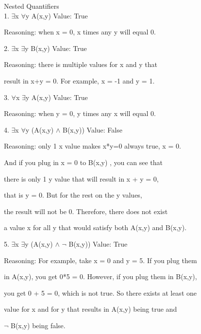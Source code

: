 \documentclass[10pt]{article}
\begin{document}
Nested Quantifiers
\\[\baselineskip] 

1. $\exists$x $\forall$y A(x,y)   
Value: True 

Reasoning: when x = 0, x times any y will equal 0.

2. $\exists$x $\exists$y B(x,y)   
Value: True 

Reasoning: there is multiple values for x and y that 

result in x+y = 0. For example, x = -1 and y = 1.

3. $\forall$x $\exists$y A(x,y)    
Value: True

Reasoning: when y = 0, y times any x will equal 0.

4. $\exists$x $\forall$y (A(x,y) $\land$ B(x,y))
Value: False

Reasoning: only 1 x value makes x*y=0 always true, x = 0.

And if you plug in x = 0 to B(x,y) , you can see that 

there is only 1 y value that will result in x + y = 0,

that is y = 0. But for the rest on the y values, 

the result will not be 0. Therefore, there does not exist 

a value x for all y that would satisfy both A(x,y) and B(x,y).

5. $\exists$x $\exists$y (A(x,y) $\land$ $\neg$ B(x,y))
Value: True

Reasoning: For example, take x = 0 and y = 5. If you plug them

in A(x,y), you get 0*5 = 0. However, if you plug them in B(x,y),

you get 0 + 5 = 0, which is not true. So there exists at least one 

value for x and for y that results in A(x,y) being true and 

$\neg$ B(x,y) being false.
\end{document}
